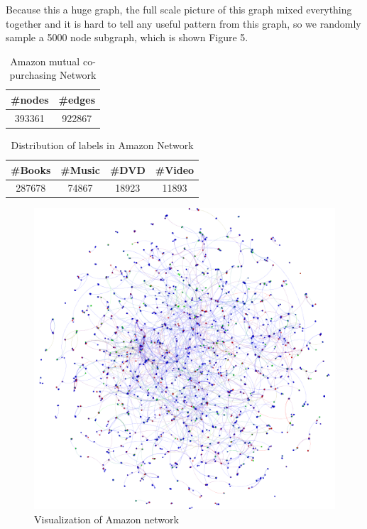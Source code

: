Because this a huge graph, the full scale picture of this graph mixed everything together and it is hard to tell any useful pattern from this graph, so we randomly sample a 5000 node subgraph, which is shown Figure 5.

\begin{table}[!ht]
\centering
\begin{tabular}{cc}
\toprule
\textbf{\#nodes} & \textbf{\#edges}\\
\midrule
393361 & 922867\\
\bottomrule
\end{tabular}
\caption{Amazon mutual co-purchasing Network}
\end{table}

\begin{table}[!ht]
\centering
\begin{tabular}{cccc}
\toprule
\textbf{\#Books} & \textbf{\#Music} & \textbf{\#DVD} & \textbf{\#Video}\\
\midrule
287678 & 74867 & 18923 & 11893\\
\bottomrule
\end{tabular}
\caption{Distribution of labels in Amazon Network}
\end{table} 

\begin{figure}[!ht]
	\centering
	\begin{minipage}[b]{0.5\linewidth}
	\centering
	\includegraphics[width=\textwidth]{FIG/amazon.png}
	\caption{Visualization of Amazon network}
	\label{fig:figure1}
	\end{minipage}
\end{figure}	


